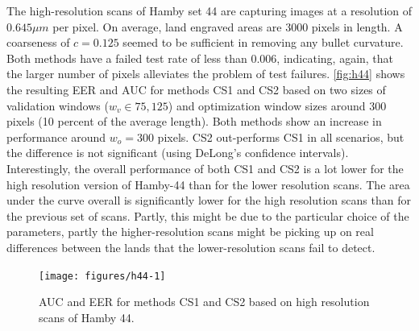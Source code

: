 \documentclass[12pt]{article}
\begin{document}
The high-resolution scans of Hamby set 44 are capturing images at a
resolution of \(0.645 \mu m\) per pixel. On average, land engraved areas
are 3000 pixels in length. A coarseness of \(c = 0.125\) seemed to be
sufficient in removing any bullet curvature. Both methods have a failed
test rate of less than 0.006, indicating, again, that the larger number
of pixels alleviates the problem of test failures. \autoref{fig:h44}
shows the resulting EER and AUC for methods CS1 and CS2 based on two
sizes of validation windows (\(w_v \in 75, 125\)) and optimization
window sizes around 300 pixels (10 percent of the average length). Both
methods show an increase in performance around \(w_o = 300\) pixels. CS2
out-performs CS1 in all scenarios, but the difference is not significant
(using DeLong's confidence intervals). Interestingly, the overall
performance of both CS1 and CS2 is a lot lower for the high resolution
version of Hamby-44 than for the lower resolution scans. The area under
the curve overall is significantly lower for the high resolution scans
than for the previous set of scans. Partly, this might be due to the
particular choice of the parameters, partly the higher-resolution scans
might be picking up on real differences between the lands that the
lower-resolution scans fail to detect.

\begin{figure}

{\centering \texttt{[image: figures/h44-1]} 

}

\caption{AUC and EER for methods CS1 and CS2 based on high resolution scans of Hamby 44. }\label{fig:h44}
\end{figure}
\end{document}
